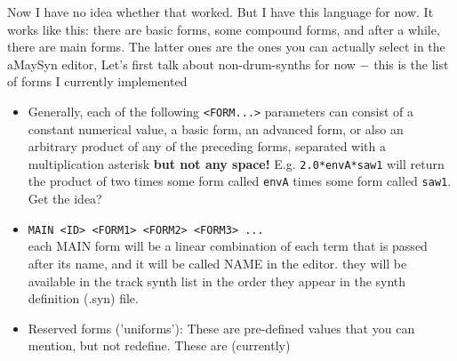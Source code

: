 \documentclass[11pt]{article}
\begin{document}
  \noindent
  Now I have no idea whether that worked. But I have this language for now. It works like this: there are basic forms, some compound forms, and after a while, there are main forms. The latter ones are the ones you can actually select in the aMaySyn editor, Let's first talk about non-drum-synths for now $-$ this is the list of forms I currently implemented
  
  \begin{itemize}
    \item Generally, each of the following \texttt{<FORM...>} parameters can consist of a constant numerical value, a basic form, an advanced form, or also an arbitrary product of any of the preceding forms, separated with a multiplication asterisk \textbf{but not any space!} E.g. \texttt{2.0*envA*saw1} will return the product of two times some form called \texttt{envA} times some form called \texttt{saw1}. Get the idea?
    \item \texttt{MAIN <ID> <FORM1> <FORM2> <FORM3> ...}\\
      each MAIN form will be a linear combination of each term that is passed after its name, and it will be called NAME in the editor. they will be available in the track synth list in the order they appear in the synth definition (.syn) file.
    \item Reserved forms ('uniforms'): These are pre-defined values that you can mention, but not redefine. These are (currently)
    

\end{itemize}
\end{document}
